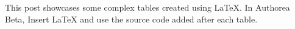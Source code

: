 This post showcases some complex tables created using LaTeX. In Authorea Beta, Insert $$LaTeX and use the source code added after each table.

\newline